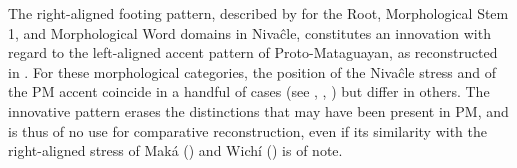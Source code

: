 \ea
    \begin{xlist}
        \ex {}
        \ex {}
        \ex {}
        \ex {}
        \ex {}
        \ex {}
        \ex {}
    \end{xlist}
\z
{}

The right-aligned footing pattern, described by \citet[7]{AnG15} for the Root, Morphological Stem 1, and Morphological Word domains in Nivaĉle, constitutes an innovation with regard to the left-aligned accent pattern of Proto-Mataguayan, as reconstructed in . For these morphological categories, the position of the Nivaĉle stress and of the PM accent coincide in a handful of cases (see , , ) but differ in others. The innovative pattern erases the distinctions that may have been present in PM, and is thus of no use for comparative reconstruction, even if its similarity with the right-aligned stress of Maká () and Wichí () is of note.

